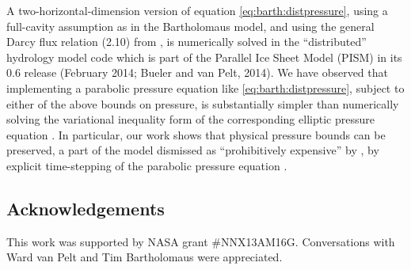 \documentclass[review,letterpaper]{igs}
\begin{document}
A two-horizontal-dimension version of equation \eqref{eq:barth:distpressure}, using a full-cavity assumption as in the Bartholomaus model, and using the general Darcy flux relation (2.10) from \cite{Schoofetal2012}, is numerically solved in the ``distributed'' hydrology model code which is part of the Parallel Ice Sheet Model (PISM) in its 0.6 release (February 2014; Bueler and van Pelt, 2014)\nocite{BuelervanPeltDRAFT}.  We have observed that implementing a parabolic pressure equation like \eqref{eq:barth:distpressure}, subject to either of the above bounds on pressure, is substantially simpler than numerically solving the variational inequality form of the corresponding elliptic pressure equation \citep{Schoofetal2012}.  In particular, our work shows that physical pressure bounds can be preserved, a part of the model dismissed as ``prohibitively expensive'' by \cite{Werderetal2013}, by explicit time-stepping of the parabolic pressure equation \citep{BuelervanPeltDRAFT,vanPeltthesis}.


\subsection*{Acknowledgements}  This work was supported by NASA grant \#NNX13AM16G.  Conversations with Ward van Pelt and Tim Bartholomaus were appreciated.



\end{document}
